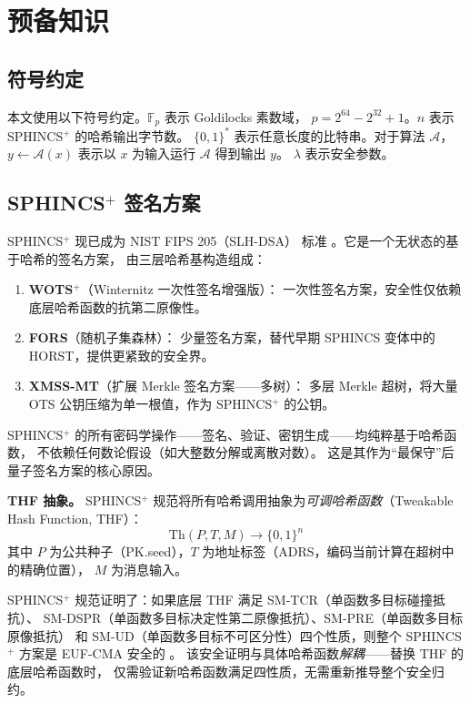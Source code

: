 \documentclass[11pt,a4paper]{ctexart}
\begin{document}
\section{预备知识}

\subsection{符号约定}

本文使用以下符号约定。$\mathbb{F}_p$ 表示 Goldilocks 素数域，
$p = 2^{64} - 2^{32} + 1$。$n$ 表示 SPHINCS$^+$ 的哈希输出字节数。
$\{0,1\}^*$ 表示任意长度的比特串。对于算法 $\mathcal{A}$，
$y \leftarrow \mathcal{A}(x)$ 表示以 $x$ 为输入运行 $\mathcal{A}$ 得到输出 $y$。
$\lambda$ 表示安全参数。

\subsection{SPHINCS$^+$ 签名方案}

SPHINCS$^+$ \cite{Bernstein2019SPHINCS} 现已成为 NIST FIPS 205（SLH-DSA）
标准 \cite{NIST2024FIPS205}。它是一个无状态的基于哈希的签名方案，
由三层哈希基构造组成：

\begin{enumerate}[label=(\arabic*),leftmargin=*]
\item \textbf{WOTS$^+$}（Winternitz 一次性签名增强版）：
一次性签名方案，安全性仅依赖底层哈希函数的抗第二原像性。
\item \textbf{FORS}（随机子集森林）：
少量签名方案，替代早期 SPHINCS 变体中的 HORST，提供更紧致的安全界。
\item \textbf{XMSS-MT}（扩展 Merkle 签名方案——多树）：
多层 Merkle 超树，将大量 OTS 公钥压缩为单一根值，作为 SPHINCS$^+$ 的公钥。
\end{enumerate}

SPHINCS$^+$ 的所有密码学操作——签名、验证、密钥生成——均纯粹基于哈希函数，
不依赖任何数论假设（如大整数分解或离散对数）。
这是其作为``最保守''后量子签名方案的核心原因。

\textbf{THF 抽象。}
SPHINCS$^+$ 规范将所有哈希调用抽象为\emph{可调哈希函数}（Tweakable Hash Function, THF）：
\begin{equation}
  \mathrm{Th}(P, T, M) \rightarrow \{0,1\}^n
\end{equation}
其中 $P$ 为公共种子（PK.seed），$T$ 为地址标签（ADRS，编码当前计算在超树中的精确位置），
$M$ 为消息输入。

SPHINCS$^+$ 规范证明了：如果底层 THF 满足 SM-TCR（单函数多目标碰撞抵抗）、
SM-DSPR（单函数多目标决定性第二原像抵抗）、SM-PRE（单函数多目标原像抵抗）
和 SM-UD（单函数多目标不可区分性）四个性质，则整个 SPHINCS$^+$ 方案是
EUF-CMA 安全的 \cite{Bernstein2019SPHINCS}。
该安全证明与具体哈希函数\emph{解耦}——替换 THF 的底层哈希函数时，
仅需验证新哈希函数满足四性质，无需重新推导整个安全归约。
\end{document}
